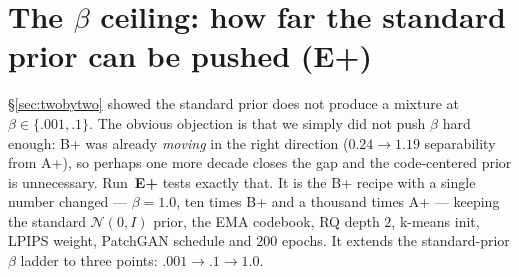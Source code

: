 \documentclass[11pt]{article}
\begin{document}
\section{The $\beta$ ceiling: how far the standard prior can be pushed (E+)}
\label{sec:betaceiling}
\S\ref{sec:twobytwo} showed the standard prior does not produce a mixture at $\beta\in\{.001,.1\}$.
The obvious objection is that we simply did not push $\beta$ hard enough: B+ was already
\emph{moving} in the right direction ($0.24\to1.19$ separability from A+), so perhaps one more
decade closes the gap and the code-centered prior is unnecessary. Run~\textbf{E+} tests exactly
that. It is the B+ recipe with a single number changed --- $\beta=1.0$, ten times B+ and a
thousand times A+ --- keeping the standard $\mathcal{N}(0,I)$ prior, the EMA codebook, RQ depth
$2$, k-means init, LPIPS weight, PatchGAN schedule and $200$ epochs. It extends the standard-prior
$\beta$ ladder to three points: $.001\to.1\to1.0$.
\end{document}
